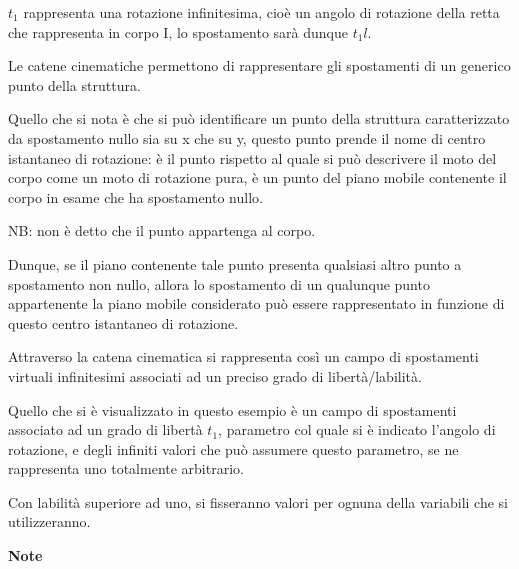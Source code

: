 \documentclass{article}
\begin{document}
\begin{adjustwidth}{2in}{}
$t_1$ rappresenta una rotazione infinitesima, cioè un angolo di rotazione della retta che rappresenta in corpo I, lo spostamento sarà dunque $t_1l$. \newline

Le catene cinematiche permettono di rappresentare gli spostamenti di un generico punto della struttura. \newline

Quello che si nota è che si può identificare un punto della struttura caratterizzato da spostamento nullo sia su x che su y, questo punto prende il nome di centro istantaneo di rotazione: è il punto rispetto al quale si può descrivere il moto del corpo come un moto di rotazione pura, è un punto del piano mobile contenente il corpo in esame che ha spostamento nullo. 

NB: non è detto che il punto appartenga al corpo. \newline 

Dunque, se il piano contenente tale punto presenta qualsiasi altro punto a spostamento non nullo, allora lo spostamento di un qualunque punto appartenente la piano mobile considerato può essere rappresentato in funzione di questo centro istantaneo di rotazione. \newline 

Attraverso la catena cinematica si rappresenta così un campo di spostamenti virtuali infinitesimi associati ad un preciso grado di libertà/labilità. 

Quello che si è visualizzato in questo esempio è un campo di spostamenti associato ad un grado di libertà $t_1$, parametro col quale si è indicato l'angolo di rotazione, e degli infiniti valori che può assumere questo parametro, se ne rappresenta uno totalmente arbitrario. \newline 

Con labilità superiore ad uno, si fisseranno valori per ognuna della variabili che si utilizzeranno. 
		
\newpage
{\Large \textbf{Note}} \mbox{} \newline		
		
		
		
		
		
		
		
	\end{adjustwidth}
\end{document}
